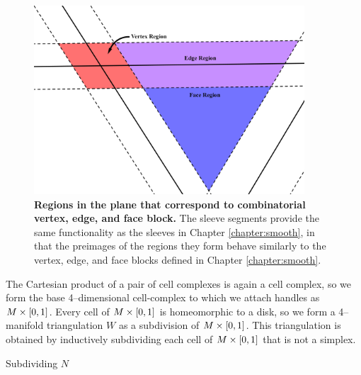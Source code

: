 
\begin{figure}[h!]
	\centering
	\includegraphics[width=0.9\textwidth]{figures/pl-regions.png}
	\caption{
		\textbf{Regions in the plane that correspond to combinatorial vertex, edge, and face block.}
		The sleeve segments provide the same functionality as the sleeves in Chapter \ref{chapter:smooth}, in that the preimages of the regions they form behave similarly to the vertex, edge, and face blocks defined in Chapter \ref{chapter:smooth}.
	}
	\label{fig:pl-regions}
\end{figure}

The Cartesian product of a pair of cell complexes is again a cell complex, so we form the base 4--dimensional cell-complex to which we attach handles as $M\times[0,1]$.
Every cell of $M\times[0,1]$ is homeomorphic to a disk, so we form a 4--manifold triangulation $W$ as a subdivision of $M\times[0,1]$.
This triangulation is obtained by inductively subdividing each cell of $M\times[0,1]$ that is not a simplex.

\begin{algorithm}[h!]
	\caption{Subdividing $N$}
	\label{alg:subdividing-manifold}
\end{algorithm}

